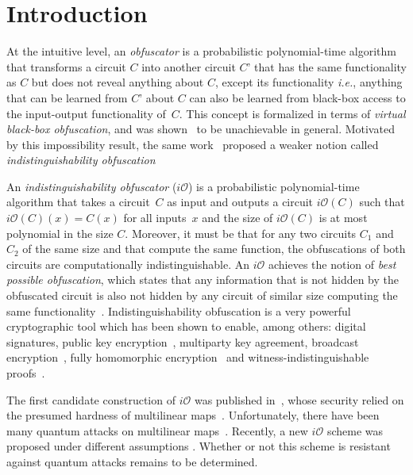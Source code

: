 \section{Introduction}
At the intuitive level, an \emph{obfuscator} is a probabilistic polynomial-time algorithm that  transforms a circuit $C$ into another circuit $C’$ that has the same functionality as $C$ but does not reveal anything about $C$, except its functionality \emph{i.e.}, anything that can be learned from $C’$ about $C$ can also be learned from  black-box access to the input-output functionality of~$C$. This concept is formalized in terms of \emph{virtual black-box obfuscation}, and was shown~\cite{BGI+12} to be unachievable in general.
Motivated by this impossibility result, the same work~\cite{BGI+12} proposed a weaker notion called \emph{indistinguishability obfuscation}

An \emph{indistinguishability obfuscator} ($i\mathcal{O}$) is a probabilistic polynomial-time algorithm that takes a circuit~$C$ as  input and outputs a circuit $i\mathcal{O}(C)$ such that $i\mathcal{O}(C)(x)=C(x)$ for all inputs~$x$ and the size of $i\mathcal{O}(C)$ is at most polynomial in the size $C$. Moreover, it must be that for any two circuits $C_1$ and $C_2$ of the same size and that compute the same function, the obfuscations of both circuits are computationally indistinguishable. An $i\mathcal{O}$ achieves the notion of \emph{best possible obfuscation}, which states that any information that is not hidden by the obfuscated circuit is also not hidden by any  circuit of similar size computing the same functionality~\cite{GR14}. Indistinguishability obfuscation is a very powerful cryptographic tool which has been shown to enable, among others: digital signatures, public key encryption~\cite{SW14}, multiparty key agreement, broadcast encryption~\cite{BZ14}, fully homomorphic encryption~\cite{CLTV15} and witness-indistinguishable proofs~\cite{BP15}.

The first candidate construction of $i\mathcal{O}$ was published in~\cite{GGH+13}, whose security relied on the presumed hardness of multilinear maps~\cite{CLT13, LSS14, GGH15}. Unfortunately, there have been many quantum attacks on  multilinear maps~\cite{ABD16, CDPR16, CGH17}.  Recently, a new $i\mathcal{O}$ scheme was proposed under  different assumptions \cite{AJL+19}. Whether or not this scheme is resistant against quantum attacks remains to be determined.

